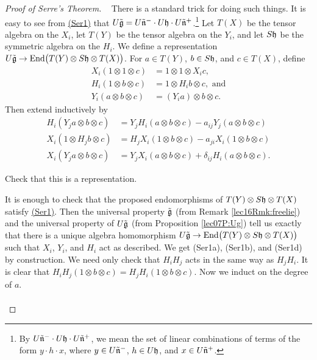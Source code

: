 \begin{proof}[Proof of Serre's Theorem]{\ }
    There is a standard trick for doing such things. It is easy to see from
    \hyperlink{Serre}{(Ser1)} that $U\tilde {\mathfrak{g}} = U\tilde {\mathfrak{n}}^- \cdot U\mathfrak{h}\cdot U\tilde
    {\mathfrak{n}}^+$.\footnote{By $U\tilde{\mathfrak{n}}^-\cdot U\mathfrak{h}\cdot U\tilde{\mathfrak{n}}^+$, we mean the set of
    linear combinations of terms of the form $y\cdot h\cdot x$, where $y\in
    U\tilde{\mathfrak{n}}^-$, $h\in U\mathfrak{h}$, and $x\in U\tilde{\mathfrak{n}}^+$.} Let $T(X)$ be the tensor
    algebra on the $X_i$, let $T(Y)$ be the tensor algebra on the $Y_i$, and let $S\mathfrak{h}$
    be the symmetric algebra on the $H_i$. We define a representation $U\tilde {\mathfrak{g}}\to
    \operatorname{End}\bigl(T(Y) \otimes S\mathfrak{h}\otimes T(X)\bigr)$. For $a\in T(Y)$, $b\in S\mathfrak{h}$, and
    $c\in T(X)$, define
    \begin{align*}
      X_i(1\otimes 1\otimes c) &= 1\otimes 1\otimes X_ic,\\
      H_i(1\otimes b\otimes c) &= 1\otimes H_ib\otimes c,\text{ and}\\
      Y_i(a\otimes b\otimes c) &= (Y_ia)\otimes b\otimes c.
    \end{align*}
    Then extend inductively by
    \begin{align*}
      H_i(Y_ja\otimes b\otimes c) &= Y_jH_i(a\otimes b\otimes c) - a_{ij}Y_j(a\otimes
              b\otimes c)\\
      X_i(1\otimes H_jb\otimes c) &= H_jX_i(1\otimes b\otimes c) - a_{ji}X_i(1\otimes
              b\otimes c)\\
      X_i(Y_ja\otimes b\otimes c) &= Y_jX_i(a\otimes b\otimes c) +
              \delta_{ij}H_i(a\otimes b\otimes c).
    \end{align*}
    \begin{exercise}
      Check that this is a representation.
      \begin{solution}
        It is enough to check that the proposed endomorphisms of $T(Y)\otimes
        S\mathfrak{h}\otimes T(X)$ satisfy \hyperlink{Serre}{(Ser1)}. Then the universal
        property $\tilde {\mathfrak{g}}$ (from Remark \ref{lec16Rmk:freelie}) and the universal
        property of $U\tilde {\mathfrak{g}}$ (from Proposition \ref{lec07P:Ug}) tell us exactly
        that there is a unique algebra homomorphism $U\tilde{\mathfrak{g}} \to
        \operatorname{End}\bigl(T(Y)\otimes S\mathfrak{h}\otimes T(X)\bigr)$ such that $X_i$, $Y_i$, and $H_i$
        act as described. We get (Ser1a), (Ser1b), and (Ser1d) by construction. We
        need only check that $H_iH_j$ acts in the same way as $H_jH_i$. It is clear
        that $H_iH_j(1\otimes b\otimes c)=H_jH_i(1\otimes b\otimes c)$. Now we induct
        on the degree of $a$.
        \begin{align*}

\end{align*}
\end{solution}
\end{exercise}
\end{proof}
